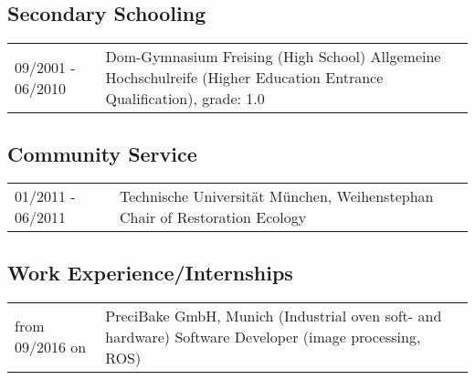 \documentclass[a4paper,10pt]{memoir}
\begin{document}
\subsection*{Secondary Schooling}
\vspace*{-\baselineskip}
\begin{longtable}{@{}p{} p{}}
  09/2001 - 06/2010 &
  Dom-Gymnasium Freising (High School) \newline 
  Allgemeine Hochschulreife (Higher Education Entrance Qualification), grade: 1.0
\end{longtable}

\subsection*{Community Service}
\vspace*{-\baselineskip}
\begin{longtable}{@{}p{} p{}}
  01/2011 - 06/2011 &
  Technische Universität München, Weihenstephan \newline 
  Chair of Restoration Ecology
\end{longtable}

\subsection*{Work Experience/Internships}
\vspace*{-\baselineskip}
\begin{longtable}{@{}p{} p{}}
  from 09/2016 on &
  PreciBake GmbH, Munich (Industrial oven soft- and hardware) \newline 
  Software Developer (image processing, ROS)
\end{longtable}
\end{document}
